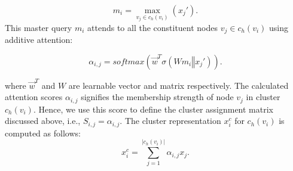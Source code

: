\documentclass[letterpaper]{article} \usepackage{aaai20}  \usepackage{times}  \usepackage{helvet} \usepackage{courier}  \usepackage[hyphens]{url}  \usepackage{graphicx} \urlstyle{rm} \def\UrlFont{\rm}  \usepackage{graphicx}  \frenchspacing  \setlength{\pdfpagewidth}{8.5in}  \setlength{\pdfpageheight}{11in}
\begin{document}
\begin{equation}
    m_i = \max_{v_{j} \in c_{h}(v_{i})}(x_{j}').
\end{equation}
This master query $m_{i}$ attends to all the constituent nodes $v_{j} \in c_{h}(v_{i})$ using additive attention:

\begin{equation}
\label{eq:m2t-add}
\alpha_{i, j} = softmax(\Vec{w}^{T}\sigma(W m_{i} \mathbin\Vert x_{j}')).
\end{equation}

where $\Vec{w}^{T}$ and $W$ are learnable vector and matrix respectively. The calculated attention scores $\alpha_{i,j}$ signifies the membership strength of node $v_{j}$ in cluster $c_{h}(v_{i})$. Hence, we use this score to define the cluster assignment matrix discussed above, i.e., $S_{i,j} = \alpha_{i,j}$. The cluster representation $x_{i}^{c}$ for ${c_{h}(v_i)}$ is computed as follows:
\begin{equation}
\label{eq:cluster_repr}
    x_{i}^{c} = \sum_{j=1}^{|c_{h}(v_{i})|} \alpha_{i,j} x_{j}.
\end{equation}
\end{document}
